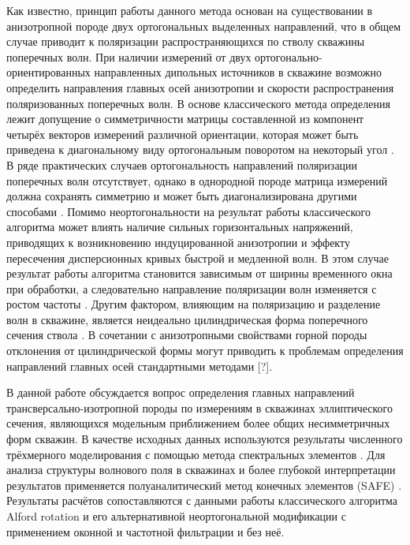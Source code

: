 \documentclass[a4paper,11pt]{article}
\begin{document}
Как известно, принцип работы данного метода основан на существовании в анизотропной породе двух ортогональных выделенных направлений, что в общем случае приводит к поляризации распространяющихся по стволу скважины поперечных волн. При наличии измерений от двух ортогонально-ориентированных направленных дипольных источников в скважине возможно определить направления главных осей анизотропии и скорости распространения поляризованных поперечных волн. В основе классического метода определения лежит допущение о симметричности матрицы составленной из компонент четырёх векторов измерений различной ориентации, которая может быть приведена к диагональному виду ортогональным поворотом на некоторый угол \cite{Alford1986}. В ряде практических случаев ортогональность направлений поляризации поперечных волн отсутствует, однако в однородной породе матрица измерений должна сохранять симметрию и может быть диагонализирована другими способами \cite{Dellinger1998}. Помимо неортогональности на результат работы классического алгоритма может влиять наличие сильных горизонтальных напряжений, приводящих к возникновению индуцированной анизотропии и эффекту пересечения дисперсионных кривых быстрой и медленной волн. В этом случае результат работы алгоритма становится зависимым от ширины временного окна при обработки, а следовательно направление поляризации волн изменяется с ростом частоты \cite{Nolte1997}. Другим фактором, влияющим на поляризацию и разделение волн в скважине, является неидеально цилиндрическая форма поперечного сечения ствола \cite{Seroices2010}. В сочетании с анизотропными свойствами горной породы отклонения от цилиндрической формы могут приводить к проблемам определения направлений главных осей стандартными методами [?].

В данной работе обсуждается вопрос определения главных направлений трансверсально-изотропной породы по измерениям в скважинах эллиптического сечения, являющихся модельным приближением более общих несимметричных форм скважин. В качестве исходных данных используются результаты численного трёхмерного моделирования с помощью метода спектральных элементов \cite{Komatitsch2000}. Для анализа структуры волнового поля в скважинах и более глубокой интерпретации результатов применяется полуаналитический метод конечных элементов (SAFE) \cite{Bartoli2006}. Результаты расчётов сопоставляются с данными работы классического алгоритма Alford rotation и его альтернативной неортогональной модификации \cite{Dellinger1998} с применением оконной и частотной фильтрации и без неё.
\end{document}
